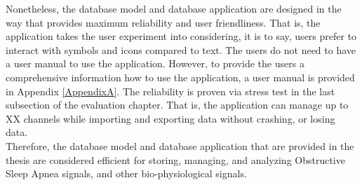 Nonetheless, the database model and database application are designed in the way that provides maximum reliability and user friendliness. That is, the application takes the user experiment into considering, it is to say, users prefer to interact with symbols and icons compared to text. The users do not need to have a user manual to use the application. However, to provide the users a comprehensive information how to use the application, a user manual is provided in Appendix \ref{AppendixA}. The reliability is proven via stress test in the last subsection of the evaluation chapter. That is, the application can manage up to XX channels while importing and exporting data without crashing, or losing data.\\
Therefore, the database model and database application that are provided in the thesis are considered efficient for storing, managing, and analyzing Obstructive Sleep Apnea signals, and other bio-physiological signals.
